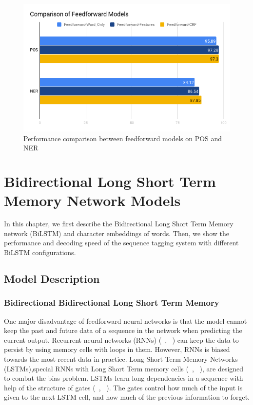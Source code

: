 \documentclass{sfuthesis}
\begin{document}
\begin{figure}
  \centering
  \includegraphics[scale=0.6]{ffbar.png}
 \caption{Performance comparison between feedforward models on POS and NER}
  \label{fig:ff}
\end{figure}



\chapter{Bidirectional Long Short Term Memory Network Models}
In this chapter, we first describe the Bidirectional Long Short Term Memory network (BiLSTM) and character embeddings of words. Then, we show the performance and decoding speed of the sequence tagging system with different BiLSTM configurations.

\section{Model Description}
\subsection{Bidirectional Bidirectional Long Short Term Memory}

One major disadvantage of feedforward neural networks is that the model cannot keep the past and future data of a sequence in the network when predicting the current output. Recurrent neural networks (RNNs) (~\citeauthor{mikolov2010recurrent}, ~\citeyear{mikolov2010recurrent}) can keep the data to persist by using memory cells with loops in them. However, RNNs is biased towards the most recent data in practice. Long Short Term Memory Networks (LSTMs),special RNNs with Long Short Term memory cells  (~\citeauthor{graves2005framewise}, ~\citeyear{graves2005framewise}), are designed to combat the bias problem. LSTMs learn long dependencies in a sequence with help of the structure of gates (~\citeauthor{graves2005framewise}, ~\citeyear{graves2005framewise}). The gates control how much of the input is given to the next LSTM cell, and how much of the previous information to forget.
\end{document}
